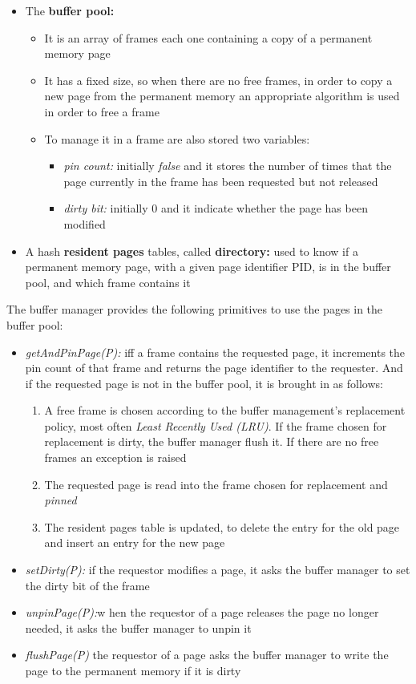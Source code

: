 \begin{itemize}
    \item The \textbf{buffer pool:}
    \begin{itemize}
        \item It is an array of frames each one containing a copy of a permanent memory page
        \item It has a fixed size, so when there are no free frames, in order to copy a new page from the permanent memory an appropriate algorithm is used in order to free a frame
        \item To manage it in a frame are also stored two variables:
        \begin{itemize}
            \item \textit{pin count:} initially \textit{false} and it stores the number of times that the page currently in the frame has been requested but not released
            \item \textit{dirty bit:} initially \(0\) and it indicate whether the page has been modified
        \end{itemize}
    \end{itemize}
    \item A hash \textbf{resident pages} tables, called \textbf{directory:}  used to know if a permanent memory page, with a given page identifier PID, is in the buffer pool, and which frame contains it
\end{itemize}
    
The buffer manager provides the following primitives to use the pages in the buffer pool:\begin{itemize}
    \item \textit{getAndPinPage(P):} iff a frame contains the requested page, it increments the pin count of that frame and returns the page identifier to the requester. And if the requested page is not in the buffer pool, it is brought in as follows:
    \begin{enumerate}
        \item A free frame is chosen according to the buffer management’s replacement policy, most often \textit{Least Recently Used (LRU)}. If the frame chosen for replacement is dirty, the buffer manager flush it. If there are no free frames an exception is raised
        \item The requested page is read into the frame chosen for replacement and \textit{pinned}
        \item The resident pages table is updated, to delete the entry for the old page and insert an entry for the new page
    \end{enumerate}
    \item \textit{setDirty(P):} if the requestor modifies a page, it asks the buffer manager to set the dirty bit of the frame
    \item \textit{unpinPage(P):}w hen the requestor of a page releases the page no longer needed, it asks the buffer manager to unpin it
    \item \textit{flushPage(P)} the requestor of a page asks the buffer manager to write the page to the permanent memory if it is dirty
\end{itemize}